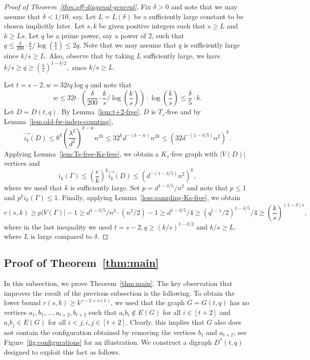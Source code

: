 \documentclass{article}
\theoremstyle{plain}
\theoremstyle{definition}
\newcommand{\fwi}[1]{\overrightarrow{i_{#1}}}
\begin{document}
\begin{proof}[Proof of Theorem~\ref{thm:off-diagonal-general}]
    Fix $\delta > 0$ and note that we may assume that $\delta < 1/10$, say. Let $L = L(\delta)$ be a sufficiently large constant to be chosen implicitly later. Let $s, k$ be given positive integers such that $s \ge L$ and $k \ge Ls$. Let $q$ be a prime power, say a power of $2$, such that $q \le \frac{\delta}{200} \cdot \frac{k}{s} / \log\left( \frac{k}{s} \right) \le 2q$. Note that we may assume that $q$ is sufficiently large since $k/s \ge L$. Also, observe that by taking $L$ sufficiently large, we have $k/s \ge q \ge \left( \frac{k}{s} \right)^{1 - \delta / 2},$ since $k/s \ge L$.
    
    Let $t = s-2, w = 32 t q \log q$ and note that 
    \[ w \le 32t \cdot  \left(\frac{\delta}{200} \cdot \frac{k}{s} / \log \left( \frac{k}{s}\right)\right) \cdot \log\left( \frac{k}{s} \right) \le  \frac{\delta}{5} \cdot k.\]
    Let $D = D(t, q)$. By Lemma~\ref{lem:t+2-free}, $D$ is $T_s$-free and by Lemma~\ref{lem:old-fw-indep-counting},
    \[ \fwi{k}(D) \le 8^k \left(\frac{\lambda^2}{d^2}\right)^{k-w} n^{2k} \le 32^k d^{-(k-w)} n^{2k} \le \left(32 d^{-(1 - \delta/5)} n^2 \right)^k. \]
    Applying Lemma~\ref{lem:Ts-free-Ks-free}, we obtain a $K_s$-free graph with $|V(D)|$ vertices and 
    \[ i_k(\Gamma) \le \left(\frac{e}{k}\right)^k \fwi{k}(D) \le \left(d^{-(1 - \delta/5)} n^2 \right)^k, \]
    where we used that $k$ is sufficiently large. Set $p = d^{1 - \delta/5} / n^2$ and note that $p \le 1$ and $p^k i_k(\Gamma) \le 1.$ Finally, applying Lemma~\ref{lem:sampling-Ks-free}, we obtain
    \[ r(s, k) \ge p |V(\Gamma)| - 1 \ge d^{1 - \delta/5} / n^2 \cdot (n^2 / 2) - 1 \ge d^{1 - \delta/5} / 4 \ge (q^{t-1} / 2)^{1 - \delta/5} / 4 \ge \left( \frac{k}{s}\right)^{(1 - \delta) s}, \]
    where in the last inequality we used $t=s-2, q \ge (k/s)^{1-\delta/2}$ and $k/s \ge L,$ where $L$ is large compared to $\delta$.
\end{proof}

\subsection{Proof of Theorem~\ref{thm:main}} \label{subsec:s-1}
In this subsection, we prove Theorem~\ref{thm:main}. The key observation that improves the result of the previous subsection is the following. To obtain the lower bound $r(s, k) \ge k^{s-2 + o(1)}$, we used that the graph $G = G(t, q)$ has no vertices $a_1, b_1, \dots, a_{t+2}, b_{t+2}$ such that $a_i b_i \not\in E(G)$ for all $i \in [t+2]$ and $a_i b_j \in E(G)$ for all $i < j, i, j \in [t+2]$. Clearly, this implies that $G$ also does not contain the configuration obtained by removing the vertices $b_1$ and $a_{t+2}$; see Figure~\ref{fig:configurations} for an illustration. We construct a digraph $D^*(t, q)$ designed to exploit this fact as follows.
\end{document}
